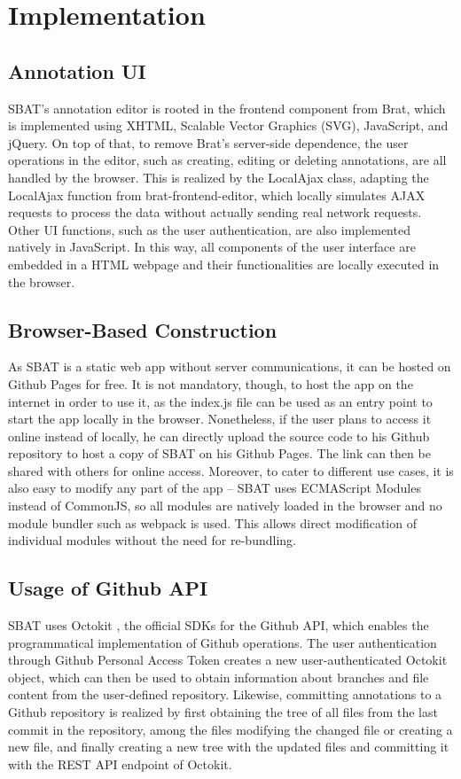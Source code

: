 \documentclass[12ptm a4paper]{article}
\begin{document}
\section{Implementation}
\subsection{Annotation UI}
SBAT's annotation editor is rooted in the frontend component from Brat, which is implemented using XHTML, Scalable Vector Graphics (SVG), JavaScript, and jQuery. On top of that, to remove Brat's server-side dependence, the user operations in the editor, such as creating, editing or deleting annotations, are all handled by the browser. This is realized by the LocalAjax class, adapting the LocalAjax function from brat-frontend-editor, which locally simulates AJAX requests to process the data without actually sending real network requests. Other UI functions, such as the user authentication, are also implemented natively in JavaScript. In this way, all components of the user interface are embedded in a HTML webpage and their functionalities are locally executed in the browser.
\subsection{Browser-Based Construction}
As SBAT is a static web app without server communications, it can be hosted on Github Pages for free. It is not mandatory, though, to host the app on the internet in order to use it, as the index.js file can be used as an entry point to start the app locally in the browser. Nonetheless, if the user plans to access it online instead of locally, he can directly upload the source code to his Github repository to host a copy of SBAT on his Github Pages. The link can then be shared with others for online access. Moreover, to cater to different use cases, it is also easy to modify any part of the app -- SBAT uses ECMAScript Modules instead of CommonJS, so all modules are natively loaded in the browser and no module bundler such as webpack is used. This allows direct modification of individual modules without the need for re-bundling.
\subsection{Usage of Github API}
SBAT uses Octokit \cite{octokit.js}, the official SDKs for the Github API, which enables the programmatical implementation of Github operations. The user authentication through Github Personal Access Token creates a new user-authenticated Octokit object, which can then be used to obtain information about branches and file content from the user-defined repository. Likewise, committing annotations to a Github repository is realized by first obtaining the tree of all files from the last commit in the repository, among the files modifying the changed file or creating a new file, and finally creating a new tree with the updated files and committing it with the REST API endpoint of Octokit.
\newpage
\end{document}
